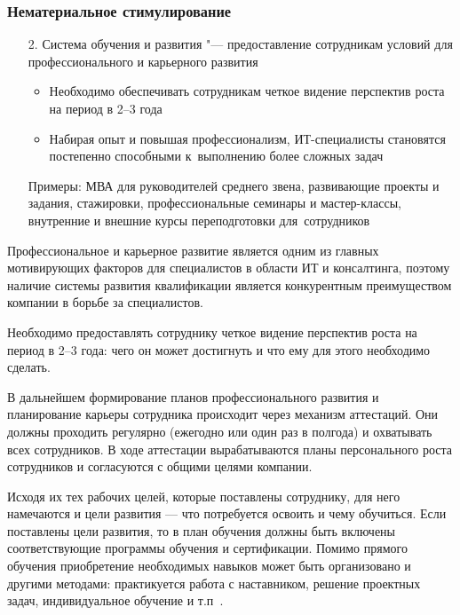 \documentclass{../industrial-development}
\begin{document}
\begin{frame} \frametitle{Нематериальное стимулирование}
				  \begin{itemize}					
					\item[2.] \alert{Система обучения и развития} "--- предоставление сотрудникам условий для профессионального и карьерного развития
					 \begin{itemize}
\item Необходимо обеспечивать сотрудникам четкое видение перспектив роста на период в 2--3 года
	\item Набирая опыт и повышая профессионализм, ИТ-специалисты
	становятся постепенно способными к~выполнению более сложных задач
	  \end{itemize}
			Примеры: МВА для руководителей среднего звена, развивающие проекты и задания, стажировки, профессиональные семинары и мастер-классы, внутренние и внешние курсы переподготовки для~сотрудников
	  \end{itemize}
		
\end{frame}

\lecturenotes

Профессиональное и карьерное развитие является одним из главных мотивирующих факторов для специалистов в области ИТ и консалтинга, поэтому наличие системы развития квалификации является конкурентным преимуществом компании в борьбе за специалистов.

Необходимо предоставлять сотруднику четкое видение перспектив роста на период в 2--3 года: чего он может достигнуть и что ему для этого необходимо сделать.

В дальнейшем формирование планов профессионального развития и планирование карьеры сотрудника происходит через механизм аттестаций. Они должны проходить регулярно (ежегодно или один раз в полгода) и охватывать всех сотрудников. В ходе аттестации вырабатываются планы персонального роста сотрудников и согласуются с общими целями компании.

Исходя их тех рабочих целей, которые поставлены сотруднику, для него намечаются и цели развития — что потребуется освоить и чему обучиться. Если поставлены цели развития, то в план обучения должны быть включены соответствующие программы обучения и сертификации. Помимо прямого обучения приобретение необходимых навыков может быть организовано и другими методами: практикуется работа с наставником, решение проектных задач, индивидуальное обучение и т.п~\cite{TriKitMotiv}.
\end{document}
